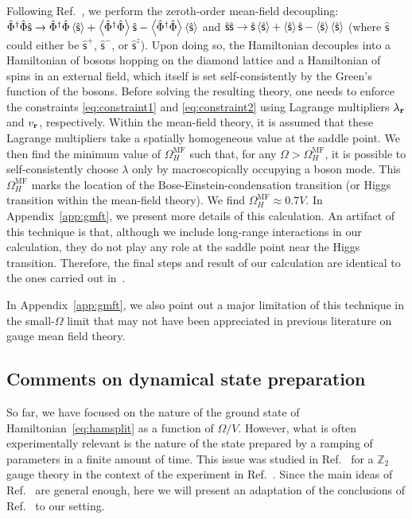\documentclass[twocolumn,superscriptaddress,amsmath,amssymb,aps,prx,nofootinbib]{revtex4-2}
\begin{document}
Following Ref.~\cite{savary2012coulombic}, we perform the  zeroth-order mean-field decoupling: $\hat{\Phi}^\dagger \hat{\Phi} \hat{\mathsf{s}} \rightarrow \hat{\Phi}^\dagger \hat{\Phi} \expval{\hat{\mathsf{s}}}+\expval{\hat{\Phi}^\dagger \hat{\Phi}} \hat{\mathsf{s}} -\expval{\hat{\Phi}^\dagger \hat{\Phi}} \expval{\hat{\mathsf{s}}} $ and $\hat{\mathsf{s}} \hat{\mathsf{s}}\rightarrow \hat{\mathsf{s}}\expval{\hat{\mathsf{s}}}+\expval{\hat{\mathsf{s}}}\hat{\mathsf{s}}-\expval{\hat{\mathsf{s}}}\expval{\hat{\mathsf{s}}}$ (where $\hat{\mathsf{s}}$ could either be $\hat{\mathsf{s}}^+$, $\hat{\mathsf{s}}^-$, or $\hat{\mathsf{s}}^z$). Upon doing so, the Hamiltonian decouples into  a Hamiltonian of bosons hopping on the diamond lattice and a Hamiltonian of spins in an external field, which itself is set self-consistently by the Green's function of the bosons. Before solving the resulting theory, one needs to enforce the constraints \eqref{eq:constraint1} and \eqref{eq:constraint2} using Lagrange multipliers $\lambda_{\vb{r}}$ and $v_{\vb{r}}$, respectively. Within the mean-field theory, it is assumed that these Lagrange multipliers take a spatially homogeneous value at the saddle point. 
We then find  the minimum value of $\Omega^{\text{MF}}_H$ such that, for any $\Omega>\Omega^{\text{MF}}_H$, it is possible to self-consistently choose $\lambda$ only by macroscopically occupying a boson mode. 
This $\Omega^{\text{MF}}_H$ marks the location of the Bose-Einstein-condensation transition (or Higgs transition within the mean-field theory). We find $\Omega^{\text{MF}}_H\approx 0.7 V$. In Appendix~\ref{app:gmft}, we present more details of this calculation. An artifact of this technique is that, although we include long-range interactions in our calculation, they do not play any role at the saddle point near the Higgs transition. Therefore, the final steps and result of our calculation are identical to the ones carried out in~\cite{savary2017disorder}. 

In Appendix~\ref{app:gmft}, we also point out a major limitation of this technique in the small-$\Omega$ limit that may not have been appreciated in previous literature on gauge mean field theory.

\subsection{Comments on dynamical state preparation}\label{sec:dynamics}
So far, we have focused on the nature of the ground state of Hamiltonian~\eqref{eq:hamsplit} as a function of $\Omega/V$. However, what is often experimentally relevant is the nature of the state prepared by a ramping of parameters in a finite amount of time. This issue was studied in Ref.~\cite{sahay2022quantum} for a $\mathbb{Z}_2$ gauge theory in the context of the experiment in Ref.~\cite{semeghini2021}. Since the main ideas of Ref.~\cite{sahay2022quantum} are general enough, here we will present an adaptation of the conclusions of Ref.~\cite{sahay2022quantum} to our setting. 
\end{document}
